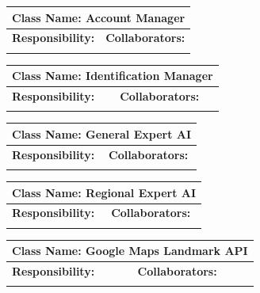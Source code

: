 \documentclass[]{article}
\begin{document}
	\begin{table}[H]
		\centering
		\begin{tabular}{|p{5cm}|p{5cm}|}
		\hline 
		 \multicolumn{2}{|l|}{\textbf{Class Name:} Account Manager} \\
		\hline
		\textbf{Responsibility:} & \textbf{Collaborators:} \\
		\hline
		\vspace{1in} & \\
		\hline
		\end{tabular}
	\end{table}

	\begin{table}[H]
		\centering
		\begin{tabular}{|p{5cm}|p{5cm}|}
		\hline 
		 \multicolumn{2}{|l|}{\textbf{Class Name:} Identification Manager} \\
		\hline
		\textbf{Responsibility:} & \textbf{Collaborators:} \\
		\hline
		\vspace{1in} & \\
		\hline
		\end{tabular}
	\end{table}

	\begin{table}[H]
		\centering
		\begin{tabular}{|p{5cm}|p{5cm}|}
		\hline 
		 \multicolumn{2}{|l|}{\textbf{Class Name:} General Expert AI} \\
		\hline
		\textbf{Responsibility:} & \textbf{Collaborators:} \\
		\hline
		\vspace{1in} & \\
		\hline
		\end{tabular}
	\end{table}

	\begin{table}[H]
		\centering
		\begin{tabular}{|p{5cm}|p{5cm}|}
		\hline 
		 \multicolumn{2}{|l|}{\textbf{Class Name:} Regional Expert AI} \\
		\hline
		\textbf{Responsibility:} & \textbf{Collaborators:} \\
		\hline
		\vspace{1in} & \\
		\hline
		\end{tabular}
	\end{table}

	\begin{table}[H]
		\centering
		\begin{tabular}{|p{5cm}|p{5cm}|}
		\hline 
		 \multicolumn{2}{|l|}{\textbf{Class Name:} Google Maps Landmark API} \\
		\hline
		\textbf{Responsibility:} & \textbf{Collaborators:} \\
		\hline
		\vspace{1in} & \\
		\hline
		\end{tabular}
	\end{table}
\end{document}
